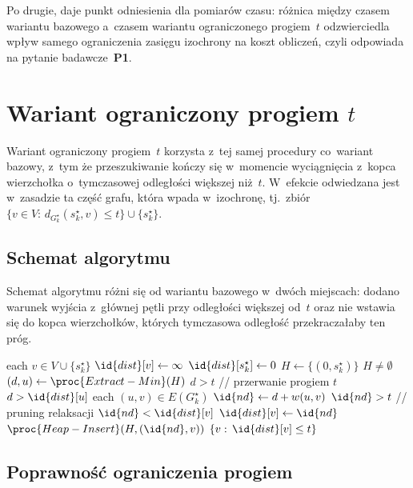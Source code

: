 Po drugie, daje punkt odniesienia dla pomiarów czasu: różnica między
czasem wariantu bazowego a~czasem wariantu ograniczonego progiem~$t$
odzwierciedla wpływ samego ograniczenia zasięgu izochrony na koszt obliczeń,
czyli odpowiada na pytanie badawcze~\textbf{P1}.

\section{Wariant ograniczony progiem $t$}
\label{sec:warianty:modified}

Wariant ograniczony progiem~$t$ korzysta z~tej samej procedury co~wariant
bazowy, z~tym że przeszukiwanie kończy się w~momencie wyciągnięcia z~kopca
wierzchołka o~tymczasowej odległości większej niż~$t$. W~efekcie odwiedzana
jest w~zasadzie ta część grafu, która wpada w~izochronę, tj.\ zbiór
$\{v\in V:\,d_{G^\star_k}(s^\star_k,v)\le t\}\cup\{s^\star_k\}$.

\subsection{Schemat algorytmu}
\label{subsec:warianty:modified:schemat}

Schemat algorytmu różni się od wariantu bazowego w~dwóch miejscach: dodano
warunek wyjścia z~głównej pętli przy odległości większej od~$t$ oraz nie
wstawia się do kopca wierzchołków, których tymczasowa odległość przekraczałaby
ten próg.

\begin{codebox}
\li \For each $v\in V\cup\{s^\star_k\}$
\li \Do $\id{dist}[v]\gets\infty$ \End
\li $\id{dist}[s^\star_k]\gets 0$
\li $H\gets\{(0,s^\star_k)\}$
\li \While $H\neq\emptyset$
\li \Do $(d,u)\gets\proc{Extract-Min}(H)$
\li     \If $d > t$
\li     \Then {}                              \quad // przerwanie progiem $t$
        \End
\li     \If $d > \id{dist}[u]$
\li     \Then {}
        \End
\li     \For each $(u,v)\in E(G^\star_k)$
\li     \Do $\id{nd}\gets d + w(u,v)$
\li         \If $\id{nd} > t$
\li         \Then {}                       \quad // pruning relaksacji
            \End
\li         \If $\id{nd} < \id{dist}[v]$
\li         \Then $\id{dist}[v]\gets\id{nd}$
\li             $\proc{Heap-Insert}(H,(\id{nd},v))$
            \End
        \End
    \End
\li \Return $\{v:\,\id{dist}[v]\le t\}$
\end{codebox}

\subsection{Poprawność ograniczenia progiem}
\label{subsec:warianty:modified:poprawnosc}

